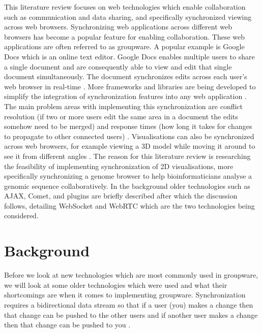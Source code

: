 \documentclass[prodmode,acmtecs]{acmsmall}
\begin{document}
This literature review focuses on web technologies which enable collaboration such as communication and data sharing, and specifically synchronized viewing across web browsers. Synchronizing web applications across different web browsers has become a popular feature for enabling collaboration. These web applications are often referred to as groupware. A popular example is Google Docs which is an online text editor. Google Docs enables multiple users to share a single document and are consequently able to view and edit that single document simultaneously. The document synchronizes edits across each user's web browser in real-time \cite{koren2013shared}. More frameworks and libraries are being developed to simplify the integration of synchronization features into any web application \cite{ozono2012real}. The main problem areas with implementing this synchronization are conflict resolution (if two or more users edit the same area in a document the edits somehow need to be merged) and response times (how long it takes for changes to propagate to other connected users) \cite{heinrich2012enriching}. Visualisations can also be synchronized across web browsers, for example viewing a 3D model while moving it around to see it from different angles \cite{marion2012real}. The reason for this literature review is researching the feasibility of implementing synchronization of 2D visualisations, more specifically synchronizing a genome browser to help bioinformaticians analyse a genomic sequence collaboratively. In the background older technologies such as AJAX, Comet, and plugins are briefly described after which the discussion follows, detailing WebSocket and WebRTC which are the two technologies being considered.  

\section{Background}
Before we look at new technologies which are most commonly used in groupware, we will look at some older technologies which were used and what their shortcomings are when it comes to implementing groupware. Synchronization requires a bidirectional data stream so that if a user (you) makes a change then that change can be pushed to the other users and if another user makes a change then that change can be pushed to you \cite{linner2012instant}.
\end{document}
